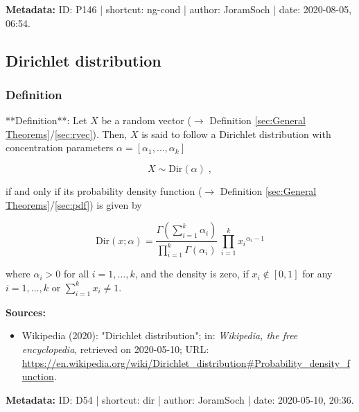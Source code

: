 \documentclass[a4paper,12pt,twoside]{book}
\begin{document}
\vspace{1em}
\textbf{Metadata:} ID: P146 | shortcut: ng-cond | author: JoramSoch | date: 2020-08-05, 06:54.
\vspace{1em}



\subsection{Dirichlet distribution}

\subsubsection[\textit{Definition}]{Definition} \label{sec:dir}
\setcounter{equation}{0}

**Definition**: Let $X$ be a random vector ($\rightarrow$ Definition \ref{sec:General Theorems}/\ref{sec:rvec}). Then, $X$ is said to follow a Dirichlet distribution with concentration parameters $\alpha = \left[ \alpha_1, \ldots, \alpha_k \right]$

\begin{equation} \label{eq:dir-Dir}
X \sim \mathrm{Dir}(\alpha) \; ,
\end{equation}

if and only if its probability density function ($\rightarrow$ Definition \ref{sec:General Theorems}/\ref{sec:pdf}) is given by

\begin{equation} \label{eq:dir-beta-pdf}
\mathrm{Dir}(x; \alpha) = \frac{\Gamma\left( \sum_{i=1}^k \alpha_i \right)}{\prod_{i=1}^k \Gamma(\alpha_i)} \, \prod_{i=1}^k {x_i}^{\alpha_i-1}
\end{equation}

where $\alpha_i > 0$ for all $i = 1, \ldots, k$, and the density is zero, if $x_i \notin [0,1]$ for any $i = 1, \ldots, k$ or $\sum_{i=1}^k x_i \neq 1$.


\vspace{1em}
\textbf{Sources:}
\begin{itemize}
\item Wikipedia (2020): "Dirichlet distribution"; in: \textit{Wikipedia, the free encyclopedia}, retrieved on 2020-05-10; URL: \url{https://en.wikipedia.org/wiki/Dirichlet_distribution#Probability_density_function}.
\end{itemize}


\vspace{1em}
\textbf{Metadata:} ID: D54 | shortcut: dir | author: JoramSoch | date: 2020-05-10, 20:36.
\vspace{1em}
\end{document}
